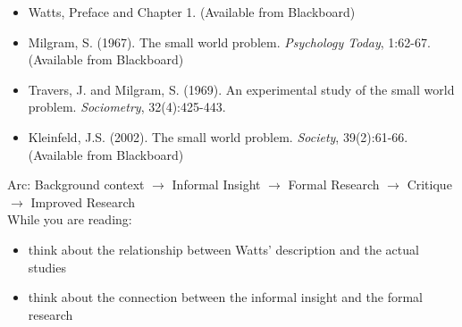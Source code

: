 \documentclass{beamer}
\begin{document}
\begin{frame}

\begin{itemize}
\item Watts, Preface and Chapter 1. (Available from Blackboard)
\item Milgram, S. (1967). The small world problem. \textit{Psychology Today}, 1:62-67. (Available from Blackboard)
\item Travers, J. and Milgram, S. (1969). An experimental study of the small world problem. \textit{Sociometry}, 32(4):425-443.
\item Kleinfeld, J.S. (2002). The small world problem. \textit{Society}, 39(2):61-66. (Available from Blackboard)
\end{itemize}

\pause
Arc: Background context $\rightarrow$ Informal Insight  $\rightarrow$ Formal Research $\rightarrow$ Critique \pause $\rightarrow$ Improved Research \\
\pause
While you are reading:
\begin{itemize}
\item think about the relationship between Watts' description and the actual studies
\pause
\item think about the connection between the informal insight and the formal research
\end{itemize}

\end{frame}
\end{document}
